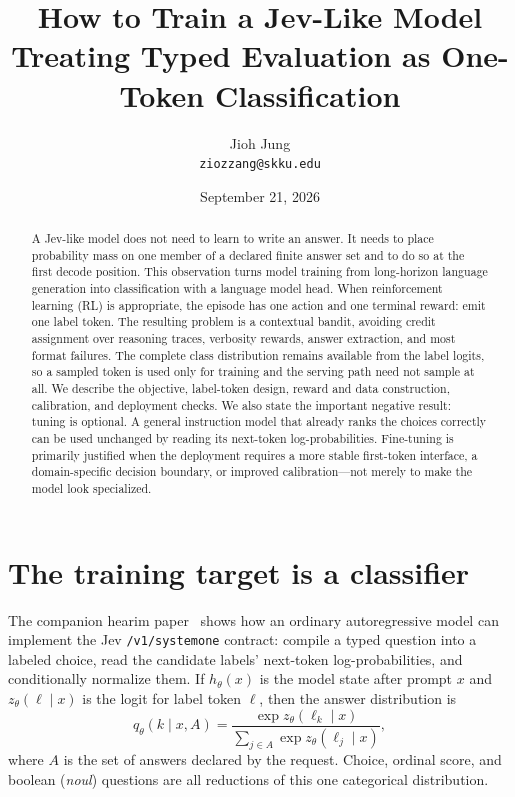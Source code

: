 \documentclass[11pt]{article}
\title{How to Train a Jev-Like Model\\
\large Treating Typed Evaluation as One-Token Classification}
\author{Jioh Jung\\ \texttt{ziozzang@skku.edu}}
\date{September 21, 2026}
\begin{document}
\maketitle

\begin{abstract}
A Jev-like model does not need to learn to write an answer.  It needs to
place probability mass on one member of a declared finite answer set and to
do so at the first decode position.  This observation turns model training
from long-horizon language generation into classification with a language
model head.  When reinforcement learning (RL) is appropriate, the episode
has one action and one terminal reward: emit one label token.  The resulting
problem is a contextual bandit, avoiding credit assignment over reasoning
traces, verbosity rewards, answer extraction, and most format failures.
The complete class distribution remains available from the label logits,
so a sampled token is used only for training and the serving path need not
sample at all.  We describe the objective, label-token design, reward and
data construction, calibration, and deployment checks.  We also state the
important negative result: tuning is optional.  A general instruction model
that already ranks the choices correctly can be used unchanged by reading
its next-token log-probabilities.  Fine-tuning is primarily justified when
the deployment requires a more stable first-token interface, a domain-specific
decision boundary, or improved calibration---not merely to make the model
look specialized.
\end{abstract}

\section{The training target is a classifier}

The companion hearim paper~\cite{hearim} shows how an ordinary
autoregressive model can implement the Jev \texttt{/v1/systemone} contract:
compile a typed question into a labeled choice, read the candidate labels'
next-token log-probabilities, and conditionally normalize them.  If
$h_\theta(x)$ is the model state after prompt $x$ and $z_\theta(\ell\mid x)$
is the logit for label token $\ell$, then the answer distribution is
\begin{equation}
q_\theta(k\mid x,A) =
\frac{\exp z_\theta(\ell_k\mid x)}
     {\sum_{j\in A}\exp z_\theta(\ell_j\mid x)},
\label{eq:conditional}
\end{equation}
where $A$ is the set of answers declared by the request.  Choice, ordinal
score, and boolean (\emph{noul}) questions are all reductions of this one
categorical distribution.
\end{document}
